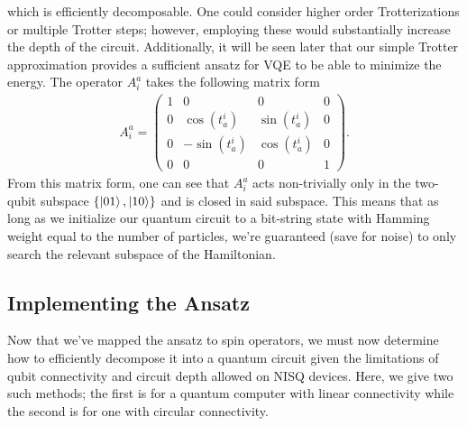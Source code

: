 \documentclass[Dual]{msu-thesis}
\begin{document}
which is efficiently decomposable. One could consider higher order Trotterizations or multiple Trotter steps; however, employing these would substantially increase the depth of the circuit. Additionally, it will be seen later that our simple Trotter approximation provides a sufficient ansatz for VQE to be able to minimize the energy. The operator $A^a_i$ takes the following matrix form
\begin{align}
A^a_i
=
\begin{pmatrix}
1 & 0 & 0 & 0 \\
0 & \cos(t^i_a) & \sin(t^i_a) & 0 \\
0 & -\sin(t^i_a) & \cos(t^i_a) & 0 \\
0 & 0 & 0 & 1
\end{pmatrix}
.\end{align}
From this matrix form, one can see that $A^a_i$ acts non-trivially only in the two-qubit subspace $\{\ket{01},\ket{10}\}$ and is closed in said subspace. This means that as long as we initialize our quantum circuit to a bit-string state with Hamming weight equal to the number of particles, we're guaranteed (save for noise) to only search the relevant subspace of the Hamiltonian.

\subsection{Implementing the Ansatz}

Now that we've mapped the ansatz to spin operators, we must now determine how to efficiently decompose it into a quantum circuit given the limitations of qubit connectivity and circuit depth allowed on NISQ devices. Here, we give two such methods; the first is for a quantum computer with linear connectivity while the second is for one with circular connectivity. 
\end{document}

